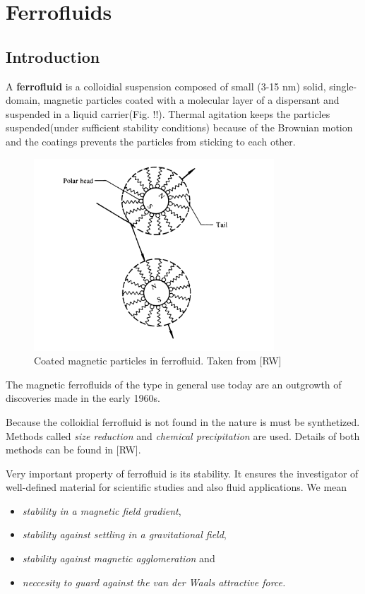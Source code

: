 \chapter{Ferrofluids}

\section{Introduction}

\par A \textbf{ferrofluid} is a colloidial suspension composed of small (3-15 nm) solid, single-domain, magnetic particles coated with a molecular layer of a dispersant and suspended in a liquid carrier(Fig. !!). Thermal agitation keeps the particles suspended(under sufficient stability conditions) because of the Brownian motion and the coatings prevents the particles from sticking to each other.

\begin{figure}[ht]
\centering
\includegraphics[width=90mm]{img/ferrofluid_schema.png}
\caption{Coated magnetic particles in ferrofluid. Taken from [RW]}
\end{figure}


\par The magnetic ferrofluids of the type in general use today are an outgrowth of discoveries made in the early 1960s.  \par Because the colloidial ferrofluid is not found in the nature is must be synthetized. Methods called \textit{size reduction} and \textit{chemical precipitation} are used. Details of both methods can be found in [RW].

\par Very important property of ferrofluid is its stability. It ensures the investigator of well-defined material for scientific studies and also fluid applications. We mean 
\begin{itemize}
\item \textit{stability in a magnetic field gradient},
\item \textit{stability against settling in a gravitational field},
\item \textit{stability against magnetic agglomeration} and
\item \textit{neccesity to guard against the van der Waals attractive force.}
\end{itemize}

